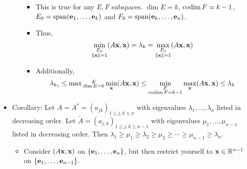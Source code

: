 \documentclass[../../notes.tex]{subfiles}
\begin{document}
\begin{itemize}
\begin{itemize}
\begin{itemize}
\begin{equation*}
            \end{equation*}
            \item This is true for any $E,F$ subspaces. $\dim E=k$, $\operatorname{codim} F=k-1$, $E_0=\operatorname{span}(\mathbf{e}_1,\dots,\mathbf{e}_k)$ and $F_0=\operatorname{span}(\mathbf{e}_k,\dots,\mathbf{e}_n)$.
            \item Thus,
            \begin{equation*}
                \min_{\substack{E_0\\\norm{\mathbf{x}}=1}}(A\mathbf{x},\mathbf{x}) = \lambda_k
                = \max_{\substack{F_0\\\norm{\mathbf{x}}=1}}(A\mathbf{x},\mathbf{x})
            \end{equation*}
            \item Additionally,
            \begin{equation*}
                \lambda_{k_1} \leq \max{\substack{E\\\dim E=k}}\min_{\mathbf{x}}(A\mathbf{x},\mathbf{x})
                \leq \min_{\substack{F\\\operatorname{codim} F=k-1}}\max_{\mathbf{x}}(A\mathbf{x},\mathbf{x})
                \leq \lambda_k
            \end{equation*}
        \end{itemize}
    \end{itemize}
    \item Corollary: Let $A=A^*=(a_{jk})_{1\leq j,k\leq n}$ with eigenvalues $\lambda_1,\dots,\lambda_n$ listed in decreasing order. Let $\tilde{A}=(a_{j,k})_{1\leq j,k\leq n-1}$ with eigenvalues $\mu_1,\dots,\mu_{n-1}$ listed in decreasing order. Then $\lambda_1\geq\mu_1\geq\lambda_2\geq\mu_2\geq\cdots\geq\mu_{n-1}\geq\lambda_n$.
    \begin{itemize}
        \item Consider $(A\mathbf{x},\mathbf{x})$ on $\{\mathbf{e}_1,\dots,\mathbf{e}_n\}$, but then restrict yourself to $\mathbf{x}\in\mathbb{R}^{n-1}$ on $\{\mathbf{e}_1,\dots,\mathbf{e}_{n-1}\}$.
    \end{itemize}
\end{itemize}
\end{document}
